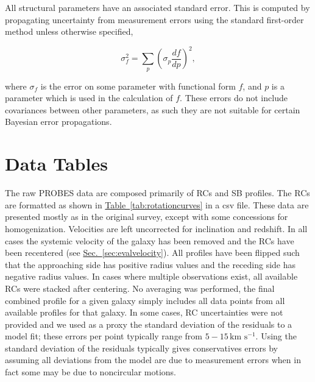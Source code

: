 \documentclass[twocolumn]{aastex631}
\newcommand{\Sec}[1]{{\protect\hyperref[sec:#1]{Sec.~\ref*{sec:#1}}}}
\newcommand{\Tab}[1]{{\protect\hyperref[tab:#1]{Table~\ref*{tab:#1}}}}
\newcommand{\wunits}[2]{\ensuremath{#1\,\text{#2}}}
\begin{document}
All structural parameters have an associated standard error.
This is computed by propagating uncertainty from measurement errors using the standard first-order method unless otherwise specified,

\begin{equation}
    \sigma_f^2 = \sum_p\left(\sigma_p\frac{df}{dp}\right)^2,
\end{equation}

where $\sigma_f$ is the error on some parameter with functional form $f$, and $p$ is a parameter which is used in the calculation of $f$.
These errors do not include covariances between other parameters, as such they are not suitable for certain Bayesian error propagations.

\section{Data Tables}\label{sec:datatables}

The raw PROBES data are composed primarily of RCs and SB profiles. 
The RCs are formatted as shown in \Tab{rotationcurves} in a csv file.
These data are presented mostly as in the original survey, except with some concessions for homogenization.
Velocities are left uncorrected for inclination and redshift.
In all cases the systemic velocity of the galaxy has been removed and the RCs have been recentered (see \Sec{evalvelocity}).
All profiles have been flipped such that the approaching side has positive radius values and the receding side has negative radius values.
In cases where multiple observations exist, all available RCs were stacked after centering.
No averaging was performed, the final combined profile for a given galaxy simply includes all data points from all available profiles for that galaxy.
In some cases, RC uncertainties were not provided and we used as a proxy the standard deviation of the residuals to a  model fit; these errors per point typically range from \wunits{5-15}{km s$^{-1}$}.
Using the standard deviation of the residuals typically gives conservatives errors by assuming all deviations from the model are due to measurement errors when in fact some may be due to noncircular motions.
\end{document}
